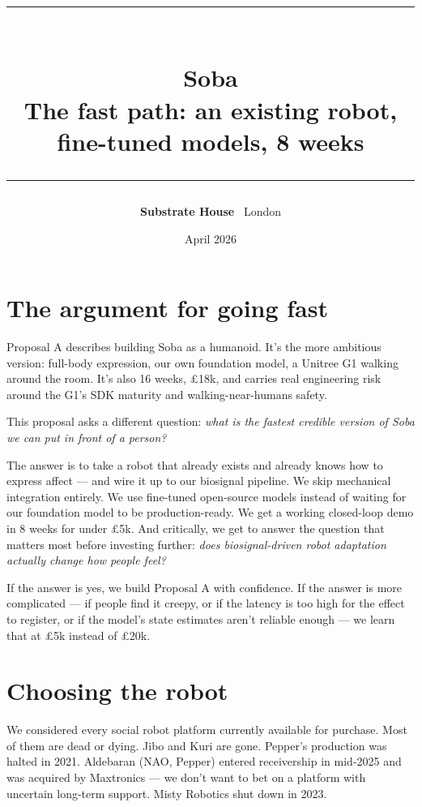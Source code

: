\documentclass[11pt,a4paper]{article}
\title{%
  \textcolor{sub}{\rule{\textwidth}{1.2pt}}\\[0.4cm]
  {\LARGE\bfseries\textcolor{sub}{Soba}}\\[0.1cm]
  {\large\textcolor{sub!60}{The fast path: an existing robot, fine-tuned models, 8 weeks}}\\[0.3cm]
  \textcolor{sub}{\rule{\textwidth}{1.2pt}}
}
\author{\textbf{Substrate House} \textperiodcentered\ London}
\date{April 2026}
\begin{document}
\maketitle
\thispagestyle{fancy}

\section{The argument for going fast}

Proposal A describes building Soba as a humanoid. It's the more ambitious version: full-body expression, our own foundation model, a Unitree G1 walking around the room. It's also 16 weeks, \pounds 18k, and carries real engineering risk around the G1's SDK maturity and walking-near-humans safety.

This proposal asks a different question: \emph{what is the fastest credible version of Soba we can put in front of a person?}

The answer is to take a robot that already exists and already knows how to express affect --- and wire it up to our biosignal pipeline. We skip mechanical integration entirely. We use fine-tuned open-source models instead of waiting for our foundation model to be production-ready. We get a working closed-loop demo in 8 weeks for under \pounds 5k. And critically, we get to answer the question that matters most before investing further: \emph{does biosignal-driven robot adaptation actually change how people feel?}

If the answer is yes, we build Proposal A with confidence. If the answer is more complicated --- if people find it creepy, or if the latency is too high for the effect to register, or if the model's state estimates aren't reliable enough --- we learn that at \pounds 5k instead of \pounds 20k.

\section{Choosing the robot}

We considered every social robot platform currently available for purchase. Most of them are dead or dying. Jibo and Kuri are gone. Pepper's production was halted in 2021. Aldebaran (NAO, Pepper) entered receivership in mid-2025 and was acquired by Maxtronics --- we don't want to bet on a platform with uncertain long-term support. Misty Robotics shut down in 2023.
\end{document}
